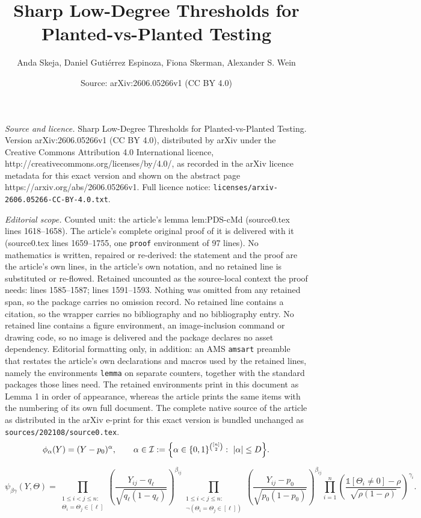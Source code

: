 \documentclass[10pt,a4paper]{amsart}
\title{Sharp Low-Degree Thresholds for Planted-vs-Planted Testing}
\author{Anda Skeja, Daniel Guti\'errez Espinoza, Fiona Skerman, Alexander S. Wein}
\date{Source: arXiv:2606.05266v1 (CC BY 4.0)}
\newcommand{\cI}{\mathcal{I}}
\begin{document}
\maketitle

\noindent\emph{Source and licence.} Sharp Low-Degree Thresholds for Planted-vs-Planted Testing. Version arXiv:2606.05266v1 (CC BY 4.0), distributed by arXiv under the Creative Commons Attribution 4.0 International licence, http://creativecommons.org/licenses/by/4.0/, as recorded in the arXiv licence metadata for this exact version and shown on the abstract page https://arxiv.org/abs/2606.05266v1. Full licence notice: \texttt{licenses/arxiv-2606.05266-CC-BY-4.0.txt}.\par\smallskip

\noindent\textit{Editorial scope.} Counted unit: the article's lemma lem:PDS-cMd (source0.tex lines 1618--1658). The article's complete original proof of it is delivered with it (source0.tex lines 1659--1755, one \texttt{proof} environment of 97 lines). No mathematics is written, repaired or re-derived: the statement and the proof are the article's own lines, in the article's own notation, and no retained line is substituted or re-flowed.  Retained uncounted as the source-local context the proof needs: lines 1585--1587; lines 1591--1593.  Nothing was omitted from any retained span, so the package carries no omission record.  No retained line contains a citation, so the wrapper carries no bibliography and no bibliography entry.  No retained line contains a figure environment, an image-inclusion command or drawing code, so no image is delivered and the package declares no asset dependency.  Editorial formatting only, in addition: an AMS \texttt{amsart} preamble that restates the article's own declarations and macros used by the retained lines, namely the environments \texttt{lemma} on separate counters, together with the standard packages those lines need.  The retained environments print in this document as Lemma 1 in order of appearance, whereas the article prints the same items with the numbering of its own full document.  The complete native source of the article as distributed in the arXiv e-print for this exact version is bundled unchanged as \texttt{sources/202108/source0.tex}.
\begin{equation}\label{eq:phi_def_PDS}
\phi_\alpha(Y)=(Y-p_0)^\alpha, \qquad \alpha \in \cI:=\Bigl\{\alpha\in\{0,1\}^{\binom{[n]}{2}}:\ |\alpha|\le D\Bigr\}.
\end{equation}

{\small\begin{equation}\label{eq:psi-PDS}
\psi_{\beta \gamma}(Y,\Theta)=\prod_{\substack{1\leq i<j\leq n:\\ \Theta_i=\Theta_j\in [\ell]}}\left(\frac{Y_{ij}-q_\ell}{\sqrt{q_\ell(1-q_\ell)}}\right)^{\beta_{ij}}\prod_{\substack{1\leq i<j\leq n:\\ \neg(\Theta_i=\Theta_j\in[\ell])}}\left(\frac{Y_{ij}-p_0}{\sqrt{p_0(1-p_0)}}\right)^{\beta_{ij}}\prod_{i=1}^n \left(\frac{\mathds{1}{[\Theta_i\neq 0]}-\rho}{\sqrt{\rho(1-\rho)}}\right)^{\gamma_i}.
\end{equation}}
\end{document}
